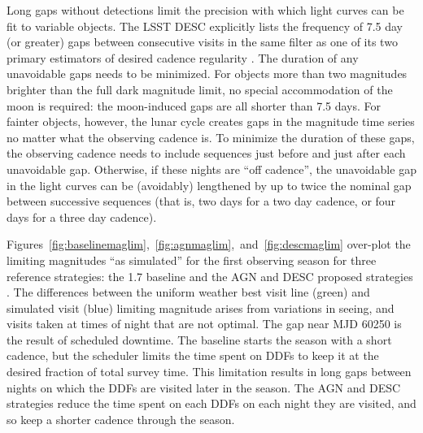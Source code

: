 \documentclass[DM,authoryear,toc]{lsstdoc}
\begin{document}
Long gaps without detections limit the precision with which light curves can be fit to variable objects.
The LSST DESC explicitly lists the frequency of 7.5 day (or greater) gaps between consecutive visits in the same filter as one of its two primary estimators of desired cadence regularity \citep{scolnic_optimizing_2018}.
The duration of any unavoidable gaps needs to be minimized.
For objects more than two magnitudes brighter than the full dark magnitude limit, no special accommodation of the moon is required: the moon-induced gaps are all shorter than 7.5 days.
For fainter objects, however, the lunar cycle creates gaps in the magnitude time series no matter what the observing cadence is.
To minimize the duration of these gaps, the observing cadence needs to include sequences just before and just after each unavoidable gap.
Otherwise, if these nights are ``off cadence'', the unavoidable gap in the light curves can be (avoidably) lengthened by up to twice the nominal gap between successive sequences (that is, two days for a two day cadence, or four days for a three day cadence).

Figures~\ref{fig:baselinemaglim},~\ref{fig:agnmaglim},~and~\ref{fig:descmaglim} over-plot the limiting magnitudes ``as simulated'' for the first observing season for three reference strategies: the 1.7 baseline and the AGN and DESC proposed strategies \citep{PSTN-051}.
The differences between the uniform weather best visit line (green) and simulated visit (blue) limiting magnitude arises from variations in seeing, and visits taken at times of night that are not optimal.
The gap near MJD 60250 is the result of scheduled downtime.
The baseline starts the season with a short cadence, but the scheduler limits the time spent on DDFs to keep it at the desired fraction of total survey time. This limitation results in long gaps between nights on which the DDFs are visited later in the season. The AGN and DESC strategies reduce the time spent on each DDFs on each night they are visited, and so keep a shorter cadence through the season.
\end{document}
